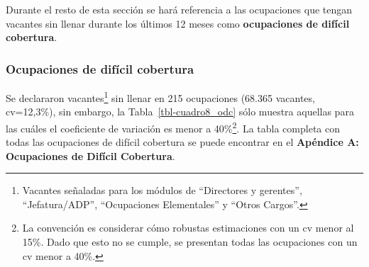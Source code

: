 \documentclass[
  11pt,
]{article}
\begin{document}
Durante el resto de esta sección se hará referencia a las ocupaciones
que tengan vacantes sin llenar durante los últimos 12 meses como
\textbf{ocupaciones de difícil cobertura}.

\newpage

\subsubsection{Ocupaciones de difícil
cobertura}\label{ocupaciones-de-difuxedcil-cobertura}

Se declararon vacantes\footnote{Vacantes señaladas para los módulos de
  ``Directores y gerentes'', ``Jefatura/ADP'', ``Ocupaciones
  Elementales'' y ``Otros Cargos''.} sin llenar en 215 ocupaciones
(68.365 vacantes, cv=12,3\%), sin embargo, la
Tabla~\ref{tbl-cuadro8_odc} sólo muestra aquellas para las cuáles el
coeficiente de variación es menor a 40\%\footnote{La convención es
  considerar cómo robustas estimaciones con un cv menor al 15\%. Dado
  que esto no se cumple, se presentan todas las ocupaciones con un cv
  menor a 40\%.}. La tabla completa con todas las ocupaciones de difícil
cobertura se puede encontrar en el \textbf{Apéndice A: Ocupaciones de
Difícil Cobertura}.
\end{document}
